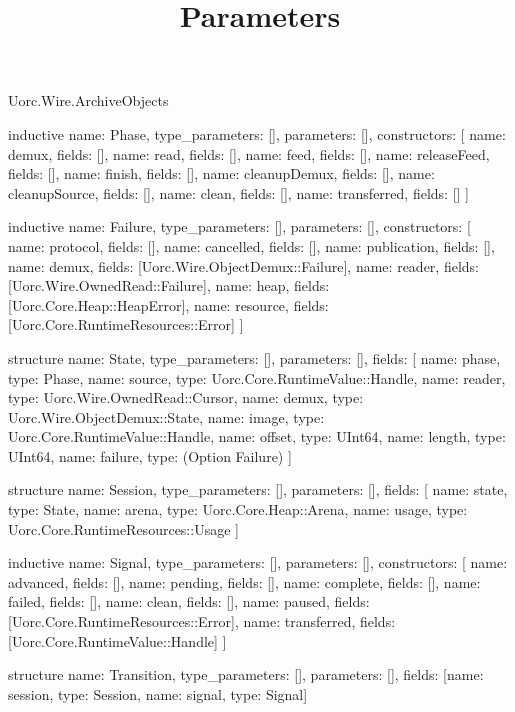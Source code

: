 \begin{lexlean}{Uorc.Wire.ArchiveObjects}
\title{Parameters}
\begin{semanticmodule}
inductive{
  name: Phase,
  type_parameters: [],
  parameters: [],
  constructors: [
    {name: demux, fields: []},
    {name: read, fields: []},
    {name: feed, fields: []},
    {name: releaseFeed, fields: []},
    {name: finish, fields: []},
    {name: cleanupDemux, fields: []},
    {name: cleanupSource, fields: []},
    {name: clean, fields: []},
    {name: transferred, fields: []}
  ]
}

inductive{
  name: Failure,
  type_parameters: [],
  parameters: [],
  constructors: [
    {name: protocol, fields: []},
    {name: cancelled, fields: []},
    {name: publication, fields: []},
    {name: demux, fields: [Uorc.Wire.ObjectDemux::Failure]},
    {name: reader, fields: [Uorc.Wire.OwnedRead::Failure]},
    {name: heap, fields: [Uorc.Core.Heap::HeapError]},
    {name: resource, fields: [Uorc.Core.RuntimeResources::Error]}
  ]
}

structure{
  name: State,
  type_parameters: [],
  parameters: [],
  fields: [
    {name: phase, type: Phase},
    {name: source, type: Uorc.Core.RuntimeValue::Handle},
    {name: reader, type: Uorc.Wire.OwnedRead::Cursor},
    {name: demux, type: Uorc.Wire.ObjectDemux::State},
    {name: image, type: Uorc.Core.RuntimeValue::Handle},
    {name: offset, type: UInt64},
    {name: length, type: UInt64},
    {name: failure, type: (Option Failure)}
  ]
}

structure{
  name: Session,
  type_parameters: [],
  parameters: [],
  fields: [
    {name: state, type: State},
    {name: arena, type: Uorc.Core.Heap::Arena},
    {name: usage, type: Uorc.Core.RuntimeResources::Usage}
  ]
}

inductive{
  name: Signal,
  type_parameters: [],
  parameters: [],
  constructors: [
    {name: advanced, fields: []},
    {name: pending, fields: []},
    {name: complete, fields: []},
    {name: failed, fields: []},
    {name: clean, fields: []},
    {name: paused, fields: [Uorc.Core.RuntimeResources::Error]},
    {name: transferred, fields: [Uorc.Core.RuntimeValue::Handle]}
  ]
}

structure{
  name: Transition,
  type_parameters: [],
  parameters: [],
  fields: [{name: session, type: Session}, {name: signal, type: Signal}]
}


\end{semanticmodule}
\end{lexlean}
